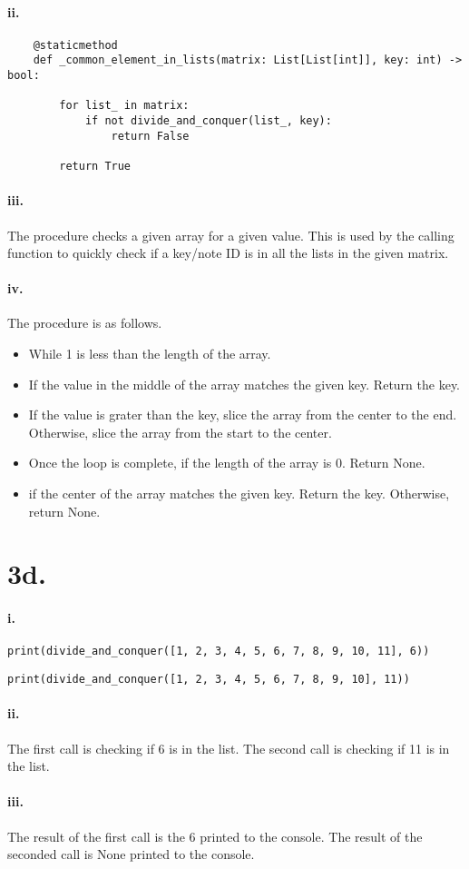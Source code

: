 \documentclass[12pt]{report}
\begin{document}
\paragraph{ii.}

\begin{lstlisting}
    @staticmethod
    def _common_element_in_lists(matrix: List[List[int]], key: int) -> bool:

        for list_ in matrix:
            if not divide_and_conquer(list_, key):
                return False

        return True

\end{lstlisting}

\paragraph{iii.}
The procedure checks a given array for a given value.
This is used by the calling function to quickly check if a key/note ID is in all the lists in the given matrix.

\paragraph{iv.}
 The procedure is as follows.
\begin{itemize}
\item While 1 is less than the length of the array.
\item If the value in the middle of the array matches the given key. Return the key.
\item If the value is grater than the key, slice the array from the center to the end. Otherwise, slice the array from the start to the center.
\item Once the loop is complete, if the length of the array is 0. Return None.
\item if the center of the array matches the given key. Return the key. Otherwise, return None.
\end{itemize}

\section{3d.}
\paragraph{i.}
\begin{lstlisting}
print(divide_and_conquer([1, 2, 3, 4, 5, 6, 7, 8, 9, 10, 11], 6))
\end{lstlisting}
\begin{lstlisting}
print(divide_and_conquer([1, 2, 3, 4, 5, 6, 7, 8, 9, 10], 11))
\end{lstlisting}

\paragraph{ii.}
The first call is checking if 6 is in the list.
The second call is checking if 11 is in the list.

\paragraph{iii.}

The result of the first call is the 6 printed to the console.
The result of the seconded call is None printed to the console.
\end{document}
